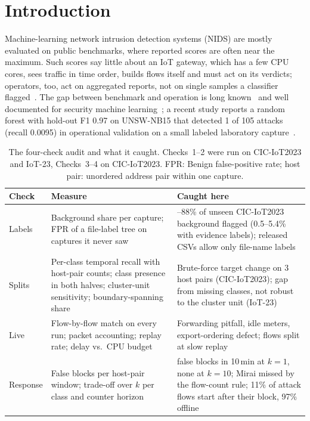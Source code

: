 \section{Introduction}\label{sec:intro}

Machine-learning network intrusion detection systems (NIDS) are mostly evaluated on public benchmarks, where reported scores are often near the maximum. Such scores say little about an IoT gateway, which has a few CPU cores, sees traffic in time order, builds flows itself and must act on its verdicts; operators, too, act on aggregated reports, not on single samples a classifier flagged~\cite{apruzzese2026reshaping}. The gap between benchmark and operation is long known~\cite{sommer2010outside} and well documented for security machine learning~\cite{arp2022dos,apruzzese2023sok}; a recent study reports a random forest with hold-out F1 0.97 on UNSW-NB15 that detected 1 of 105 attacks (recall 0.0095) in operational validation on a small labeled laboratory capture~\cite{tang2026hybrid}.

\begin{table}[t]
\centering
\caption{The four-check audit and what it caught. Checks~1--2 were run on CIC-IoT2023 and IoT-23, Checks~3--4 on CIC-IoT2023. FPR: Benign false-positive rate; host pair: unordered address pair within one capture.}
\label{tab:checklist}
\footnotesize
\setlength{\tabcolsep}{3pt}
\begin{tabular}{>{\raggedright\arraybackslash}p{1.55cm}>{\raggedright\arraybackslash}p{3.2cm}>{\raggedright\arraybackslash}p{3.25cm}}
\toprule
Check & Measure & Caught here \\
\midrule
1 Labels & Background share per capture; FPR of a file-label tree on captures it never saw & 71--88\% of unseen CIC-IoT2023 background flagged (0.5--5.4\% with evidence labels); released CSVs allow only file-name labels \\
\addlinespace[2pt]
2 Splits & Per-class temporal recall with host-pair counts; class presence in both halves; cluster-unit sensitivity; boundary-spanning share & Brute-force target change on 3 host pairs (CIC-IoT2023); gap from missing classes, not robust to the cluster unit (IoT-23) \\
\addlinespace[2pt]
3 Live & Flow-by-flow match on every run; packet accounting; replay rate; delay vs.\ CPU budget & Forwarding pitfall, idle meters, export-ordering defect; flows split at slow replay \\
\addlinespace[2pt]
4 Response & False blocks per host-pair window; trade-off over $k$ per class and counter horizon & 60 false blocks in 10\,min at $k=1$, none at $k=10$; Mirai missed by the flow-count rule; 11\% of attack flows start after their block, 97\% offline \\
\bottomrule
\end{tabular}
\end{table}

